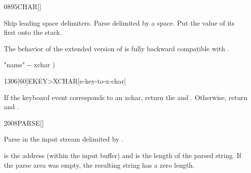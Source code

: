 \begin{worddef}{0895}{CHAR}[]%
\item {}

	Skip leading space delimiters.  Parse  delimited by a space.
	Put the value of its first  onto the stack.


	\begin{rationale} %
		The behavior of the extended version of  is fully backward
		compatible with .
	\end{rationale}

	\begin{implement} %
	\word{:}   "name" -{}- xchar )
		      \word{;}
	\end{implement}
\end{worddef}

\enlargethispage{8ex}
\begin{worddef}[EKEYtoXCHAR]{1306}[60]{EKEY>XCHAR}[e-key-to-x-char]%
\item {}

	If the keyboard event  corresponds to an xchar, return the
	 and .  Otherwise, return  and
	.

\end{worddef}


\begin{worddef}{2008}{PARSE}[]%
\item {}

  Parse  in the input stream delimited by .

	 is the address (within the input buffer) and 
	is the length of the parsed string. If the parse area was empty, the
	resulting string has a zero length.

\end{worddef}


